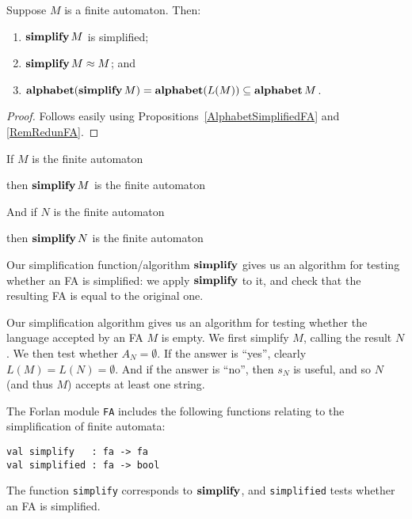 \begin{proposition}
Suppose $M$ is a finite automaton.
Then:
\begin{enumerate}[\quad(1)]
\item $\mathbf{simplify}\,M$ is simplified;

\item $\mathbf{simplify}\,M\approx M$; and

\item $\mathbf{alphabet}(\mathbf{simplify}\,M) = \mathbf{alphabet}(L(M)) \subseteq\mathbf{alphabet}\,M$.
\end{enumerate}
\end{proposition}

\begin{proof}
Follows easily using Propositions~\ref{AlphabetSimplifiedFA} and
\ref{RemRedunFA}.
\end{proof}

If $M$ is the finite automaton
\begin{center}

\end{center}
then $\mathbf{simplify}\,M$ is the finite automaton
\begin{center}

\end{center}
And if $N$ is the finite automaton
\begin{center}

\end{center}
then $\mathbf{simplify}\,N$ is the finite automaton
\begin{center}

\end{center}

Our simplification function/algorithm $\mathbf{simplify}$ gives us an
algorithm for testing whether an FA is simplified: we apply
$\mathbf{simplify}$ to it, and check that the resulting FA is equal to
the original one.

Our simplification algorithm gives us an algorithm for testing whether
the language accepted by an FA $M$ is empty. We first simplify $M$,
calling the result $N$. We then test whether $A_N=\emptyset$.  If
the answer is ``yes'', clearly $L(M)=L(N)=\emptyset$. And if the
answer is ``no'', then $s_N$ is useful, and so $N$ (and thus $M$) accepts
at least one string.

The Forlan module \texttt{FA}
%
includes the following functions relating to the simplification of
finite automata:
\begin{verbatim}
val simplify   : fa -> fa
val simplified : fa -> bool
\end{verbatim}
%
%
The function \texttt{simplify} corresponds to $\mathbf{simplify}$, and
\texttt{simplified} tests whether an FA is simplified.


